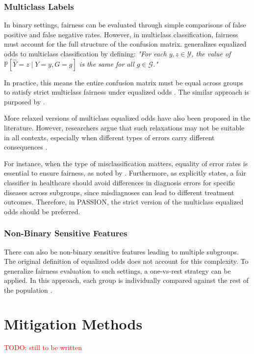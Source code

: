 \documentclass[12pt, a4paper, oneside]{book}   	%
\renewcommand{\todo}[1]{\textcolor{red}{TODO: #1}}
\begin{document}
		\subsubsection{Multiclass Labels}
		In binary settings, fairness can be evaluated through simple comparisons of false positive and false negative rates. However, in multiclass classification, fairness must account for the full structure of the confusion matrix. \textcite{Sabato_2024} generalizes equalized odds to multiclass classification by defining:
		\textit{"For each \( y, z \in \mathcal{Y} \), the value of \( \mathbb{P}[\hat{Y} = z \mid Y = y, G = g] \) is the same for all \( g \in \mathcal{G} \)."}
		
		In practice, this means the entire confusion matrix must be equal across groups to satisfy strict multiclass fairness under equalized odds \autocite{Sabato_2024}. The similar approach is purposed by \textcite{Putzel_2022}.
		
		More relaxed versions of multiclass equalized odds have also been proposed in the literature. However, researchers argue that such relaxations may not be suitable in all contexts, especially when different types of errors carry different consequences \autocites{Sabato_2024}{Putzel_2022}.
		
		For instance, when the type of misclassification matters, equality of error rates is essential to ensure fairness, as noted by \textcite{Putzel_2022}. Furthermore, as \textcite{Sabato_2024} explicitly states, a fair classifier in healthcare should avoid differences in diagnosis errors for specific diseases across subgroups, since misdiagnoses can lead to different treatment outcomes. Therefore, in PASSION, the strict version of the multiclass equalized odds should be preferred.
		
		\subsubsection{Non-Binary Sensitive Features}
		There can also be non-binary sensitive features leading to multiple subgroups. The original definition of equalized odds does not account for this complexity. To generalize fairness evaluation to such settings, a one-vs-rest strategy can be applied. In this approach, each group is individually compared against the rest of the population \autocite{Nezami_2024}.
		
		
			
		\section{Mitigation Methods}
			 \todo{still to be written}
			 
\end{document}
